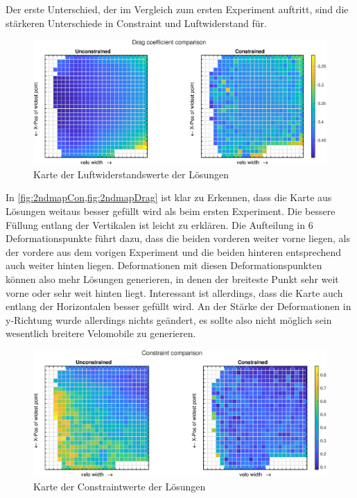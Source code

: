 Der erste Unterschied, der im Vergleich zum ersten Experiment auftritt, sind die stärkeren Unterschiede in Constraint und Luftwiderstand für.


\begin{figure}[h]
	\includegraphics[width=1\linewidth]{bilder/6pt500Samples/dragMapComparison}
	\caption{Karte der Luftwiderstandswerte der Lösungen}
	\label{fig:2ndmapDrag}
\end{figure}

In \cref{fig:2ndmapCon,fig:2ndmapDrag} ist klar zu Erkennen, dass die Karte aus Lösungen weitaus besser gefüllt wird als beim ersten Experiment.
Die bessere Füllung entlang der Vertikalen ist leicht zu erklären.
Die Aufteilung in 6 Deformationspunkte führt dazu, dass die beiden vorderen weiter vorne liegen, als der vordere aus dem vorigen Experiment und die beiden hinteren entsprechend auch weiter hinten liegen.
Deformationen mit diesen Deformationspunkten können also mehr Lösungen generieren, in denen der breiteste Punkt sehr weit vorne oder sehr weit hinten liegt.
Interessant ist allerdings, dass die Karte auch entlang der Horizontalen  besser gefüllt wird.
An der Stärke der Deformationen in y-Richtung wurde allerdings nichts geändert, es sollte also nicht möglich sein wesentlich breitere Velomobile zu generieren.


\begin{figure}[h]
	\includegraphics[width=1\linewidth]{bilder/6pt500Samples/constraintMapComparison}
	\caption{Karte der Constraintwerte der Lösungen}
	\label{fig:2ndmapCon}
\end{figure}

